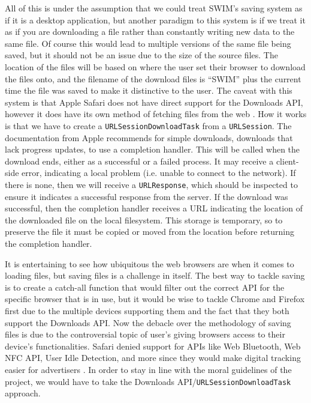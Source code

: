 \documentclass[
    paper=letter,
    parskip=half,
    fontsize=12pt,
    titlepage=firstiscover,
    toc=bibliography,
    numbers=endperiod
]{scrartcl}
\begin{document}
All of this is under the assumption that we could treat SWIM's saving
system as if it is a desktop application, but another paradigm to this
system is if we treat it as if you are downloading a file rather than
constantly writing new data to the same file. Of course this would lead
to multiple versions of the same file being saved, but it should not be
an issue due to the size of the source files. The location of the files
will be based on where the user set their browser to download the files
onto, and the filename of the download files is ``SWIM'' plus the
current time the file was saved to make it distinctive to the user. The
caveat with this system is that Apple Safari does not have direct
support for the Downloads API, however it does have its own method of
fetching files from the web \cite{apple-downloading}. How it works is
that we have to create a \texttt{URLSessionDownloadTask} from a
\texttt{URLSession}. The documentation from Apple recommends for simple
downloads, downloads that lack progress updates, to use a completion
handler. This will be called when the download ends, either as a
successful or a failed process. It may receive a client-side error,
indicating a local problem (i.e. unable to connect to the network). If
there is none, then we will receive a \texttt{URLResponse}, which should
be inspected to ensure it indicates a successful response from the
server. If the download was successful, then the completion handler
receives a URL indicating the location of the downloaded file on the
local filesystem. This storage is temporary, so to preserve the file it
must be copied or moved from the location before returning the
completion handler.

It is entertaining to see how ubiquitous the web browsers are when it
comes to loading files, but saving files is a challenge in itself. The
best way to tackle saving is to create a catch-all function that would
filter out the correct API for the specific browser that is in use, but
it would be wise to tackle Chrome and Firefox first due to the multiple
devices supporting them and the fact that they both support the
Downloads API. Now the debacle over the methodology of saving files is
due to the controversial topic of user's giving browsers access to their
device's functionalities. Safari denied support for APIs like Web
Bluetooth, Web NFC API, User Idle Detection, and more since they would
make digital tracking easier for advertisers \cite{cimpanu2020}. In
order to stay in line with the moral guidelines of the project, we would
have to take the Downloads API/\texttt{URLSessionDownloadTask} approach.
\end{document}
